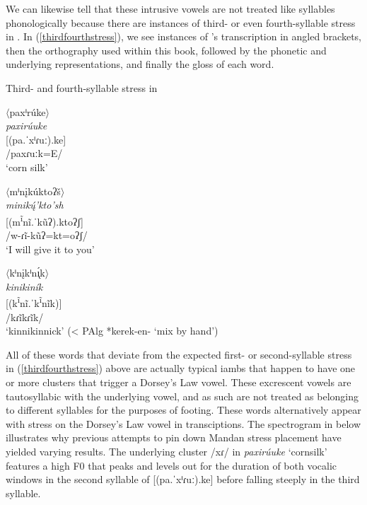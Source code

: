 We can likewise tell that these intrusive vowels are not treated like syllables phonologically because there are instances of third- or even fourth-syllable stress in \citet{hollow1970}. In (\ref{thirdfourthstress}), we see instances of \citeauthor{hollow1970}'s transcription in angled brackets, then the orthography used within this book, followed by the phonetic and underlying representations, and finally the gloss of each word.

\begin{exe}
\item\label{thirdfourthstress} Third- and fourth-syllable stress in \citet{hollow1970}

\begin{xlist}
\item $\langle$paxⁱrúke$\rangle$\\
	\textit{paxirúuke}\\
 	{[}(pa.ˈxⁱɾuː).ke]\\
	/paxɾuːk=E/\\
        `corn silk'

\newpage
\item $\langle$mⁱnįkúktoʔš$\rangle$\\
	\textit{minikų́'kto'sh}\\
	{[}(m\textsuperscript{ĩ}nĩ.ˈkũʔ).ktoʔʃ]\\
	/w-ɾĩ-kũʔ=kt=oʔʃ/\\
        `I will give it to you'

\item $\langle$kⁱnįkⁱn\'{ı̨}k$\rangle$\\
    \textit{kinikiník}\\
    {[}(k\textsuperscript{ĩ}nĩ.ˈk\textsuperscript{ĩ}nĩk)]\\
    /kɾĩkɾĩk/\\
    `kinnikinnick' (< PAlg *kerek-en- `mix by hand')
\end{xlist}

\end{exe}

All of these words that deviate from the expected first- or second-syllable stress in (\ref{thirdfourthstress}) above are actually typical iambs that happen to have one or more clusters that trigger a Dorsey's Law vowel. These excrescent vowels are tautosyllabic with the underlying vowel, and as such are not treated as belonging to different syllables for the purposes of footing. These words alternatively appear with stress on the Dorsey's Law vowel in  transciptions. The spectrogram in  below illustrates why previous attempts to pin down Mandan stress placement have yielded varying results. The underlying cluster /xɾ/ in \textit{paxirúuke} `cornsilk' features a high F0 that peaks and levels out for the duration of both vocalic windows in the second syllable of [(pa.ˈxⁱɾuː).ke] before falling steeply in the third syllable.

